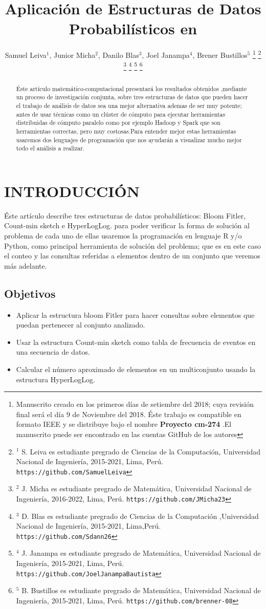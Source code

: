 \documentclass[journal]{IEEEtran}
\title{\LARGE \bf Aplicaci\'on de Estructuras de Datos Probabil\'isticos en
}
\author{Samuel Leiva$^{1}$, Junior Micha$^{2}$, Danilo Blas$^{3}$, Joel Janampa$^{4}$, Brener Bustillos$^{5}$%
\thanks{Manuscrito creado en los primeros d\'ias de setiembre del 2018; cuya revisi\'on final ser\'a el d\'ia 9 de Noviembre del 2018. \'Este trabajo es compatible en formato IEEE y se distribuye bajo el nombre \textbf{Proyecto cm-274} .El manuscrito puede ser encontrado en las cuentas GitHub de los autores}%
\thanks{$^{1}$ S. Leiva es estudiante pregrado de Ciencias de la Computaci\'on, Universidad Nacional de Ingenier\'ia, 2015-2021, Lima, Per\'u.
        {\tt\small https://github.com/SamuelLeiva}}%
\thanks{$^{2}$ J. Micha es estudiante pregrado de Matem\'atica, Universidad Nacional de Ingenier\'ia, 2016-2022, Lima, Per\'u.
        {\tt\small https://github.com/JMicha23}}%
\thanks{$^{3}$ D. Blas es estudiante pregrado de Ciencias de la Computaci\'on ,Universidad Nacional de Ingenier\'ia, 2015-2021, Lima,Per\'u.
        {\tt\small https://github.com/Sdann26}}%
\thanks{$^{4}$ J. Janampa es estudiante pregrado de Matem\'atica, Universidad Nacional de Ingenier\'ia, 2015-2021, Lima, Per\'u.
        {\tt\small https://github.com/JoelJanampaBautista}}%
\thanks{$^{5}$ B. Bustillos es estudiante pregrado de Matem\'atica, Universidad Nacional de Ingenier\'ia, 2015-2021, Lima, Per\'u. 
        {\tt\small https://github.com/brenner-08}}%
}
\begin{document}
\maketitle
\thispagestyle{empty}
\pagestyle{empty}


\begin{abstract}
   
\'Este art\'iculo matem\'atico-computacional presentar\'a los resultados obtenidos ,mediante un proceso de investigaci\'on conjunta, sobre tres estructuras de datos que pueden hacer el trabajo de an\'alisis de datos sea una mejor alternativa ademas de ser muy potente; antes de usar t\'ecnicas como un cl\'uster de c\'omputo para ejecutar herramientas distribuidas de c\'omputo paralelo como por ejemplo  Hadoop y Spark que son herramientas correctas, pero muy costosas.Para entender mejor estas herramientas usaremos dos lenguajes de programaci\'on que nos ayudar\'an a visualizar mucho mejor todo el an\'alisis a realizar. 

\end{abstract}


\section{INTRODUCCI\'ON}

\'Este art\'iculo describe tres estructuras de datos probabil\'isticos: Bloom Fitler, Count-min sketch e HyperLogLog. para poder verificar la forma de soluci\'on al problema de cada uno de ellas usaremos la programaci\'on en lenguaje R y/o Python, como principal herramienta de soluci\'on del problema; que es en este caso el conteo y las consultas referidas a elementos dentro de un conjunto que veremos m\'as adelante.

\subsection{Objetivos}

\begin{itemize}
    \item Aplicar la estructura bloom Fitler para hacer consultas sobre elementos que puedan pertenecer al conjunto analizado. 
    \item Usar la estructura Count-min sketch como tabla de frecuencia de eventos en una secuencia de datos.
    \item Calcular el número aproximado de elementos en un multiconjunto usando la estructura HyperLogLog. 
\end{itemize}
\end{document}

